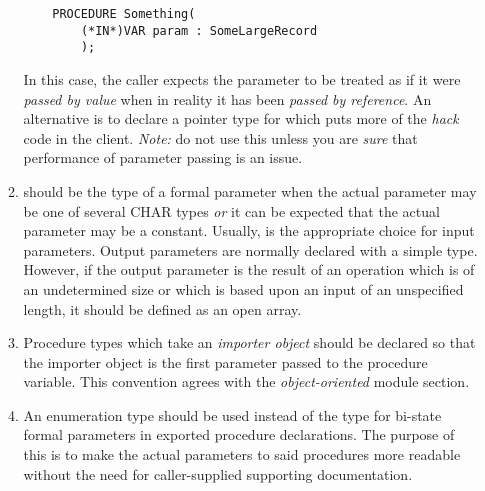 \begin{enumerate}
\begin{enumerate}
\begin{verbatim}
    PROCEDURE Something(
        (*IN*)VAR param : SomeLargeRecord
        );
        \end{verbatim}
        In this case, the caller expects the parameter to be treated as
        if it were {\em passed by value} when in reality it has been 
        {\em passed by reference}.  An alternative is to declare
        a pointer type for  which puts more of the
        {\em hack} code in the client.  {\em Note:} do not use this unless
        you are {\em sure} that performance of parameter passing is an
        issue.
    \item
         should be the type of a formal parameter
        when the actual parameter may be one of several CHAR types {\em or}
        it can be expected that the actual parameter may be a constant.
        Usually,  is the appropriate choice for input
        parameters.  Output parameters are normally declared with a simple 
        type.   However, if the output parameter is the result of
        an operation which is of an undetermined size or
        which is based upon an input of an unspecified length,
	it should be defined as an open array.
    
    \item
        Procedure types which take an {\em importer object} should
        be declared so that the importer object is the first parameter
        passed to the procedure variable.  This convention agrees with
        the {\em object-oriented} module section.

    \item
        An enumeration type should be used instead of the
        type  for bi-state formal parameters in exported
	procedure declarations.  The purpose of this is to make the actual
	parameters to said procedures more readable without the need
	for caller-supplied supporting documentation.


\end{enumerate}
\end{enumerate}
